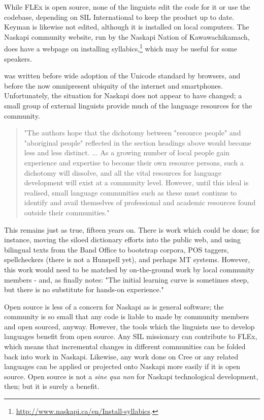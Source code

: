 While FLEx is open source, none of the linguists edit the code for it or use the codebase, depending on SIL International to keep the product up to date. Keyman is likewise not edited, although it is installed on local computers. The Naskapi community website, run by the Naskapi Nation of Kawawachikamach, does have a webpage on installing syllabics,\footnote{\href{http://www.naskapi.ca/en/Install-syllabics}{http://www.naskapi.ca/en/Install-syllabics}. } which may be useful for some speakers.

\citet{jancewicz2002applied} was written before wide adoption of the Unicode standard by browsers, and before the now omnipresent ubiquity of the internet and smartphones. Unfortunately, the situation for Naskapi does not appear to have changed; a small group of external linguists provide much of the language resources for the community.

\begin{quote}
"The authors hope that the dichotomy between "resource people" and "aboriginal people" reflected in the section headings above would become less and less distinct. ... As a growing number of local people gain experience and expertise to become their own resource persons, such a dichotomy will dissolve, and all the vital resources for language development will exist at a community level. However, until this ideal is realised, small language communities such as these must continue to identify and avail themselves of professional and academic resources found outside their communities." \citep[89]{jancewicz2002applied}
\end{quote}

This remains just as true, fifteen years on. There is work which could be done; for instance, moving the siloed dictionary efforts into the public web, and using bilingual texts from the Band Office to bootstrap corpora, POS taggers, spellcheckers (there is not a Hunspell yet), and perhaps MT systems. However, this work would need to be matched by on-the-ground work by local community members - and, as \citet[90]{jancewicz2002applied} finally notes: "The initial learning curve is sometimes steep, but there is no substitute for hands-on experience."

Open source is less of a concern for Naskapi as is general software; the community is so small that any code is liable to made by community members and open sourced, anyway. However, the tools which the linguists use to develop languages benefit from open source. Any SIL missionary can contribute to FLEx, which means that incremental changes in different communities can be folded back into work in Naskapi. Likewise, any work done on Cree or any related languages can be applied or projected onto Naskapi more easily if it is open source. Open source is not a {\it sine qua non} for Naskapi technological development, then; but it is surely a benefit.


